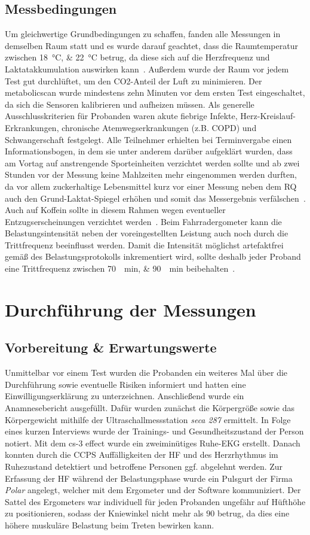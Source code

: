 \subsection{Messbedingungen}
%
Um gleichwertige Grundbedingungen zu schaffen, fanden alle Messungen in demselben Raum statt und es wurde darauf geachtet, dass die Raumtemperatur zwischen \SIlist{18;22}{\degreeCelsius} betrug, da diese sich auf die Herzfrequenz und Laktatakkumulation auswirken kann~\cite{Marino.2001}. Außerdem wurde der Raum vor jedem Test gut durchlüftet, um den \acs{CO2}-Anteil der Luft zu minimieren. Der metabolicscan wurde mindestens zehn Minuten vor dem ersten Test eingeschaltet, da sich die Sensoren kalibrieren und aufheizen müssen.
Als generelle Ausschlusskriterien für Probanden waren akute fiebrige Infekte, Herz-Kreislauf-Erkrankungen, chronische Atemwegserkrankungen (z.B. COPD) und Schwangerschaft festgelegt. Alle Teilnehmer erhielten bei Terminvergabe einen Informationsbogen, in dem sie unter anderem darüber aufgeklärt wurden, dass am Vortag auf anstrengende Sporteinheiten verzichtet werden sollte und ab zwei Stunden vor der Messung keine Mahlzeiten mehr eingenommen werden durften, da vor allem zuckerhaltige Lebensmittel kurz vor einer Messung neben dem RQ auch den Grund-Laktat-Spiegel erhöhen und somit das Messergebnis verfälschen~\cite{Ivy.1981}. Auch auf Koffein sollte in diesem Rahmen wegen eventueller Entzugserscheinungen verzichtet werden~\cite{Kroidl.2015}. Beim Fahrradergometer kann die Belastungsintensität neben der voreingestellten Leistung auch noch durch die Trittfrequenz beeinflusst werden. Damit die Intensität möglichst artefaktfrei gemäß des Belastungsprotokolls inkrementiert wird, sollte deshalb jeder Proband eine Trittfrequenz zwischen \SIlist{70;90}{\per\minute} beibehalten~\cite{Wonisch.2008}.
%
\section{Durchführung der Messungen}
%
\subsection{Vorbereitung \& Erwartungswerte}
%
Unmittelbar vor einem Test wurden die Probanden ein weiteres Mal über die Durchführung sowie eventuelle Risiken informiert und hatten eine Einwilligungserklärung zu unterzeichnen. Anschließend wurde ein Anamnesebericht ausgefüllt. Dafür wurden zunächst die Körpergröße sowie das Körpergewicht mithilfe der Ultraschallmessstation \textsl{seca 287} ermittelt. In Folge eines kurzen Interviews wurde der Trainings- und Gesundheitszustand der Person notiert. Mit dem cs-3 effect wurde ein zweiminütiges Ruhe-\acs{EKG} erstellt. Danach konnten durch die \acs{CCPS} Auffälligkeiten der \acs{HF} und des Herzrhythmus im Ruhezustand detektiert und betroffene Personen ggf. abgelehnt werden. Zur Erfassung der \acs{HF} während der Belastungsphase wurde ein Pulsgurt der Firma \textsl{Polar} angelegt, welcher mit dem Ergometer und der Software kommuniziert. Der Sattel des Ergometers war individuell für jeden Probanden ungefähr auf Hüfthöhe zu positionieren, sodass der Kniewinkel nicht mehr als $90$ \textdegree{} betrug, da dies eine höhere muskuläre Belastung beim Treten bewirken kann.
%
